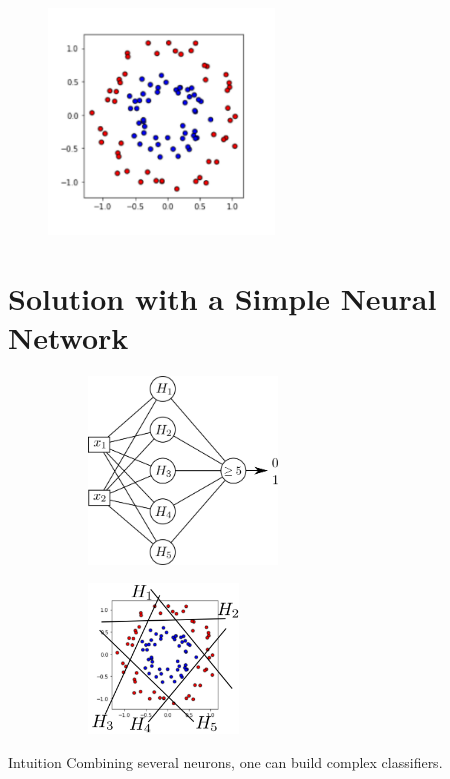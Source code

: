 \documentclass{book}
\begin{document}
\begin{figure}[h]
    \centering
    \includegraphics[height=6cm]{circles}
\end{figure}

\section{Solution with a Simple Neural Network}

\begin{figure}[h]
    \centering
    \begin{subfigure}{.5\textwidth}
        \includegraphics[height=5cm]{ann_5}
    \end{subfigure}
    \begin{subfigure}{.5\textwidth}
        \includegraphics[height=4cm]{circles_H}
    \end{subfigure}
\end{figure}

\begin{block}{Intuition}
Combining several neurons, one can build complex classifiers.
\end{block}
\end{document}
